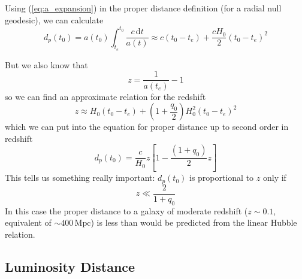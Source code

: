 \par Using (\ref{eq:a_expansion}) in the proper distance definition (for a radial null geodesic), we can calculate
\begin{equation}
    d_{p}(t_{0}) = a(t_{0})\int_{t_{e}}^{t_{0}} \frac{c\,\text{d}t}{a(t)} \approx c(t_{0}-t_{e}) + \frac{cH_{0}}{2}(t_{0}-t_{e})^{2}
\end{equation}
\par But we also know that
\begin{equation*}
    z = \frac{1}{a(t_{e})}-1
\end{equation*}
so we can find an approximate relation for the redshift
\begin{equation*}
    z \approx H_{0}(t_{0}-t_{e})+\left(1+\frac{q_{0}}{2}\right)H_{0}^{2}(t_{0}-t_{e})^{2}
\end{equation*}
which we can put into the equation for proper distance up to second order in redshift
\begin{equation}
    d_{p}(t_{0}) = \frac{c}{H_{0}}z\left[1-\frac{(1+q_{0})}{2}z\right]
    \label{eq:properdistance_rs_second}
\end{equation}
This tells us something really important: $d_{p}(t_{0})$ is proportional to $z$ only if
\begin{equation*}
    z \ll \frac{2}{1+q_{0}}
\end{equation*}
In this case the proper distance to a galaxy of moderate redshift ($z \sim 0.1$, equivalent of $\sim 400 \,\text{Mpc}$) is less than would be predicted from the
linear Hubble relation.

\subsection{Luminosity Distance}

